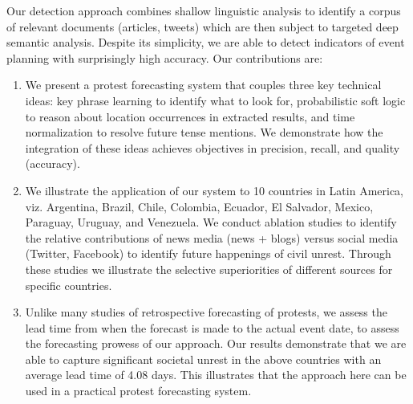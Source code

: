 Our detection approach 
combines shallow linguistic analysis to identify a corpus of relevant
documents (articles, tweets) which are then subject to targeted deep semantic analysis.
Despite its simplicity, we are able to
detect indicators of event planning with surprisingly high
accuracy. 
Our contributions are:
\begin{enumerate}
\item We present a protest forecasting system that couples three key technical ideas:
key phrase learning to identify what to look for, probabilistic soft logic to reason about location occurrences in extracted results, and 
time normalization to resolve future tense mentions. We demonstrate how the integration of these ideas achieves objectives in precision,
recall, and quality (accuracy).
\item We illustrate the application of our system to 10 countries in Latin America, viz. Argentina, Brazil, Chile, Colombia, Ecuador, El Salvador, Mexico, Paraguay, Uruguay, and Venezuela. 
We conduct ablation studies to identify the 
relative contributions of news media (news + blogs) versus social media (Twitter, Facebook) to identify future happenings of
civil unrest. Through these studies we illustrate the selective superiorities of different sources for specific countries.
\item Unlike many studies of retrospective forecasting of protests,
we assess the lead time from when the forecast is made to
the actual event date, to assess the forecasting prowess of our approach. 
Our results demonstrate that we are able to 
capture significant societal unrest in the above countries with an average lead time of 4.08 days. This illustrates that the
approach here can be used in a practical protest forecasting system.
\end{enumerate}

